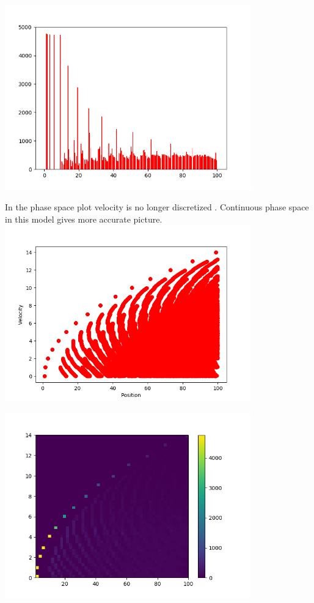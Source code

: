 \documentclass[a4paper]{article}
\begin{document}
\begin{center}
\includegraphics[width=0.8\textwidth]{Figure_2_v5.png}
\end{center}
\begin{center}
In the phase space plot velocity is no longer discretized . Continuous phase space in this model gives more accurate picture.
\includegraphics[width=0.8\textwidth]{Figure_3_v5.png}
\end{center}
\begin{center}
\includegraphics[width=0.8\textwidth]{Figure_4_v5.png}
\end{center}
\end{document}
